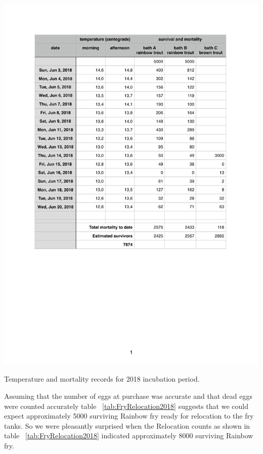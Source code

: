\begin{table}[H]
  \centering
  \includegraphics[scale = 0.9]{tables/TablesIncubationMortality.pdf}
   \caption{Temperature and mortality records for 2018 incubation period.}
  \label{tab:Incubation2018}
\end{table}

Assuming that the number of eggs at purchase was accurate and that dead eggs were counted accurately
table ~\ref{tab:FryRelocation2018} suggests that we could expect approximately 5000 surviving Rainbow fry 
ready for relocation to the fry tanks. So we were pleasantly surprised when the Relocation counts as 
shown in table ~\ref{tab:FryRelocation2018} indicated approximately 8000 surviving Rainbow fry.

